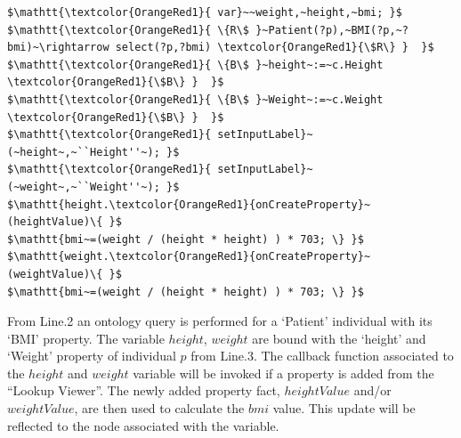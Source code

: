 \documentclass[a4paper]{llncs}
\begin{document}
{
\footnotesize
{}
\lstset{basicstyle=\ttfamily,identifierstyle=\ttfamily,keywordstyle=\ttfamily}
\lstset{stringstyle=\ttfamily, columns=fullflexible}
\begin{lstlisting}[mathescape=ture,frame=tb,captionpos=b,showspaces=false,showstringspaces=false,showtabs=false,tabsize=2, label=t1]
$\mathtt{\textcolor{OrangeRed1}{ var}~~weight,~height,~bmi; }$
$\mathtt{\textcolor{OrangeRed1}{ \{R\$ }~Patient(?p),~BMI(?p,~?bmi)~\rightarrow select(?p,?bmi) \textcolor{OrangeRed1}{\$R\} }  }$
$\mathtt{\textcolor{OrangeRed1}{ \{B\$ }~height~:=~c.Height  \textcolor{OrangeRed1}{\$B\} }  }$
$\mathtt{\textcolor{OrangeRed1}{ \{B\$ }~Weight~:=~c.Weight  \textcolor{OrangeRed1}{\$B\} }  }$
$\mathtt{\textcolor{OrangeRed1}{ setInputLabel}~(~height~,~``Height''~); }$
$\mathtt{\textcolor{OrangeRed1}{ setInputLabel}~(~weight~,~``Weight''~); }$
$\mathtt{height.\textcolor{OrangeRed1}{onCreateProperty}~(heightValue)\{ }$
$\mathtt{bmi~=(weight / (height * height) ) * 703; \} }$
$\mathtt{weight.\textcolor{OrangeRed1}{onCreateProperty}~(weightValue)\{ }$
$\mathtt{bmi~=(weight / (height * height) ) * 703; \} }$
\end{lstlisting}
}
\normalsize{}




From Line.2 an ontology query is performed for a `Patient' individual with its `BMI' property. 
The variable $height$, $weight$ are bound with the `height' and `Weight' property of individual $p$ from Line.3. 
The callback function associated to the $height$ and $weight$ variable will be invoked if a property is added from the ``Lookup Viewer''. 
The newly added property fact, $heightValue$ and/or $weightValue$, are then used to calculate the $bmi$ value. This update will be reflected to the node associated with the variable. 
\end{document}
